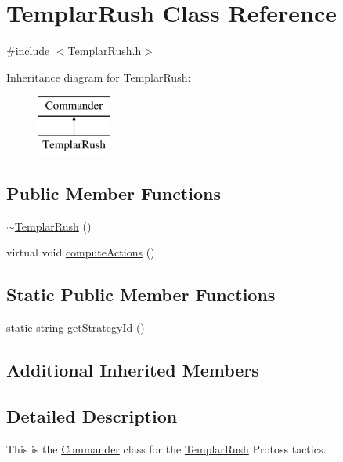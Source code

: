 \hypertarget{class_templar_rush}{\section{Templar\-Rush Class Reference}
\label{class_templar_rush}
}


{\ttfamily \#include $<$Templar\-Rush.\-h$>$}

Inheritance diagram for Templar\-Rush\-:\begin{figure}[H]
\begin{center}
\leavevmode
\includegraphics[height=2.000000cm]{class_templar_rush}
\end{center}
\end{figure}
\subsection*{Public Member Functions}
\begin{DoxyCompactItemize}
\item 
\hyperlink{class_templar_rush_ad65f8fe75894f3a5cdddc12a0498b202}{$\sim$\-Templar\-Rush} ()
\item 
virtual void \hyperlink{class_templar_rush_a4844082ce98056a9861a499072654a7b}{compute\-Actions} ()
\end{DoxyCompactItemize}
\subsection*{Static Public Member Functions}
\begin{DoxyCompactItemize}
\item 
static string \hyperlink{class_templar_rush_abc64eb98645944a5ada670e0cb3d8916}{get\-Strategy\-Id} ()
\end{DoxyCompactItemize}
\subsection*{Additional Inherited Members}


\subsection{Detailed Description}
This is the \hyperlink{class_commander}{Commander} class for the \hyperlink{class_templar_rush}{Templar\-Rush} Protoss tactics.

